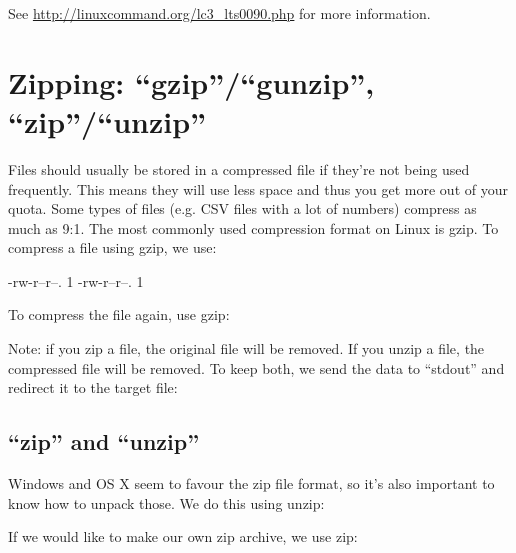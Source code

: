 See \url{http://linuxcommand.org/lc3_lts0090.php} for more information.

\section{Zipping: ``gzip''/``gunzip'', ``zip''/``unzip''}

Files should usually be stored in a compressed file if they're not being used
frequently. This means they will use less space and thus you get more out of
your quota. Some types of files (e.g. CSV files with a lot of numbers) compress
as much as 9:1. The most commonly used compression format on Linux is gzip. To
compress a file using gzip, we use:

\begin{prompt}
    -rw-r--r--. 1 %
    -rw-r--r--. 1 %
\end{prompt}


To compress the file again, use gzip:

\begin{prompt}
\end{prompt}

Note: if you zip a file, the original file will be removed. If you unzip a file,
the compressed file will be removed. To keep both, we send the data to
``stdout'' and redirect it to the target file:

\begin{prompt}
\end{prompt}

\subsection{``zip'' and ``unzip''}

Windows and OS X seem to favour the zip file format, so it's also important to
know how to unpack those. We do this using unzip:

\begin{prompt}
\end{prompt}

If we would like to make our own zip archive, we use zip:

\begin{prompt}
\end{prompt}

